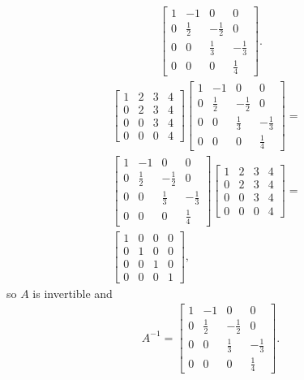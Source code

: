 \documentclass[12pt]{article}
\begin{document}
\begin{enumerate}
\begin{align*}
      \begin{bmatrix}
        1 & -1 & 0 & 0\\
        0 & \frac{1}{2} & -\frac{1}{2} & 0\\
        0 & 0 & \frac{1}{3} & -\frac{1}{3}\\
        0 & 0 & 0 & \frac{1}{4}
      \end{bmatrix}.
    \end{align*}
    \begin{align*}
      \begin{bmatrix}
        1 & 2 & 3 & 4\\
        0 & 2 & 3 & 4\\
        0 & 0 & 3 & 4\\
        0 & 0 & 0 & 4
      \end{bmatrix}
      \begin{bmatrix}
        1 & -1 & 0 & 0\\
        0 & \frac{1}{2} & -\frac{1}{2} & 0\\
        0 & 0 & \frac{1}{3} & -\frac{1}{3}\\
        0 & 0 & 0 & \frac{1}{4}
      \end{bmatrix}
      =&\\
      \begin{bmatrix}
        1 & -1 & 0 & 0\\
        0 & \frac{1}{2} & -\frac{1}{2} & 0\\
        0 & 0 & \frac{1}{3} & -\frac{1}{3}\\
        0 & 0 & 0 & \frac{1}{4}
      \end{bmatrix}
      \begin{bmatrix}
        1 & 2 & 3 & 4\\
        0 & 2 & 3 & 4\\
        0 & 0 & 3 & 4\\
        0 & 0 & 0 & 4
      \end{bmatrix}
      =&\\
      \begin{bmatrix}
        1 & 0 & 0 & 0\\
        0 & 1 & 0 & 0\\
        0 & 0 & 1 & 0\\
        0 & 0 & 0 & 1
      \end{bmatrix},
    \end{align*}
    so $A$ is invertible and
    \begin{align*}
      A^{-1} =
      \begin{bmatrix}
        1 & -1 & 0 & 0\\
        0 & \frac{1}{2} & -\frac{1}{2} & 0\\
        0 & 0 & \frac{1}{3} & -\frac{1}{3}\\
        0 & 0 & 0 & \frac{1}{4}
      \end{bmatrix}.
    \end{align*}
\end{enumerate}
\end{document}
